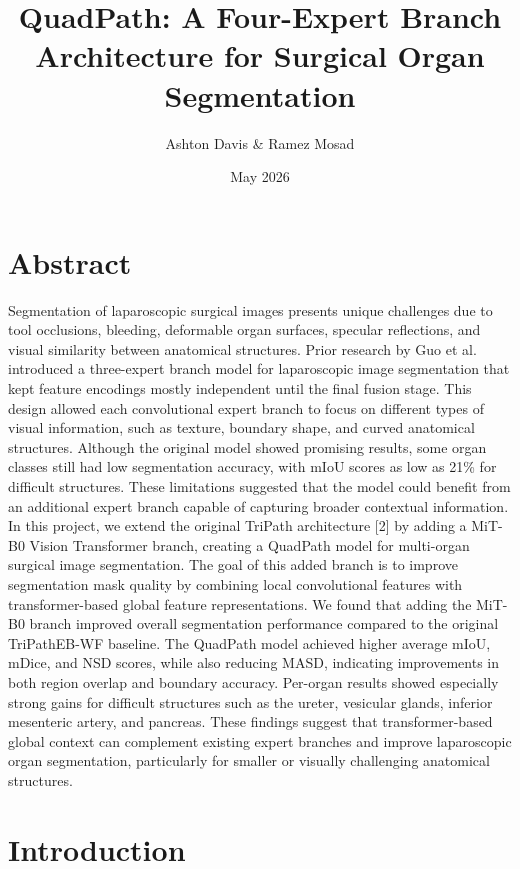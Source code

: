 \documentclass[twocolumn]{article}
\title{QuadPath: A Four-Expert Branch Architecture for Surgical Organ Segmentation}
\author{Ashton Davis \& Ramez Mosad}
\date{May 2026}
\begin{document}
\maketitle

\section{Abstract}

Segmentation of laparoscopic surgical images presents unique challenges due to tool occlusions, bleeding, deformable organ surfaces, specular reflections, and visual similarity between anatomical structures. Prior research by Guo et al. introduced a three-expert branch model for laparoscopic image segmentation that kept feature encodings mostly independent until the final fusion stage. This design allowed each convolutional expert branch to focus on different types of visual information, such as texture, boundary shape, and curved anatomical structures. Although the original model showed promising results, some organ classes still had low segmentation accuracy, with mIoU scores as low as 21\% for difficult structures. These limitations suggested that the model could benefit from an additional expert branch capable of capturing broader contextual information. In this project, we extend the original TriPath architecture [2] by adding a MiT-B0 Vision Transformer branch, creating a QuadPath model for multi-organ surgical image segmentation. The goal of this added branch is to improve segmentation mask quality by combining local convolutional features with transformer-based global feature representations. We found that adding the MiT-B0 branch improved overall segmentation performance compared to the original TriPathEB-WF baseline. The QuadPath model achieved higher average mIoU, mDice, and NSD scores, while also reducing MASD, indicating improvements in both region overlap and boundary accuracy. Per-organ results showed especially strong gains for difficult structures such as the ureter, vesicular glands, inferior mesenteric artery, and pancreas. These findings suggest that transformer-based global context can complement existing expert branches and improve laparoscopic organ segmentation, particularly for smaller or visually challenging anatomical structures.

\section{Introduction}
\end{document}
